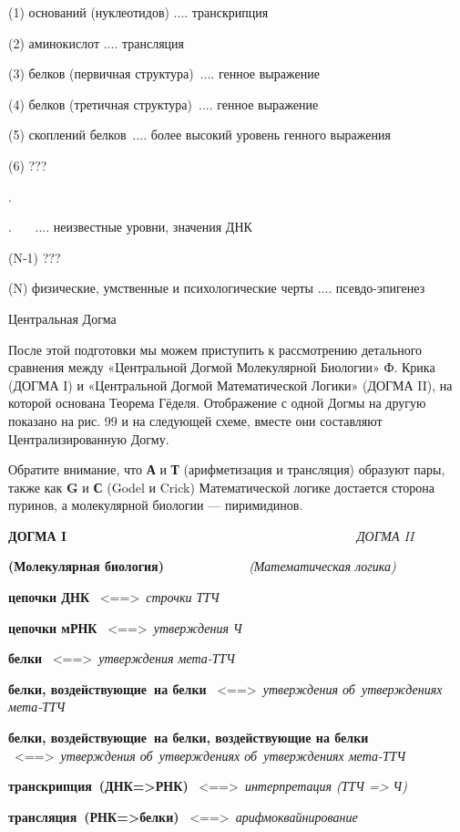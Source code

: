 \documentclass[../main.tex]{subfiles}
\begin{document}
(1) оснований (нуклеотидов) .... транскрипция

(2) аминокислот .... трансляция

(3) белков (первичная структура)~.... генное выражение

(4) белков (третичная структура)~.... генное выражение

(5) скоплений белков~.... более высокий уровень генного выражения

(6) ???

.

.~~~ .... неизвестные уровни, значения ДНК

(N-1) ???

(N) физические, умственные и психологические черты .... псевдо-эпигенез

Центральная Догма

После этой подготовки мы можем приступить к рассмотрению детального сравнения между «Центральной Догмой Молекулярной Биологии» Ф. Крика (ДОГМА I) и «Центральной Догмой Математической Логики» (ДОГМА II), на которой основана Теорема Гёделя. Отображение с одной Догмы на другую показано на рис. 99 и на следующей схеме, вместе они составляют Централизированную Догму.

Обратите внимание, что \textbf{А} и \textbf{Т} (арифметизация и трансляция) образуют пары, также как \textbf{G} и \textbf{С} (Godel и Crick) Математической логике достается сторона пуринов, а молекулярной биологии --- пиримидинов.

\textbf{ДОГМА I~~~~~~~~~~~~~~~~~~~~~~~~~~~~~~~~~~~~~~~} \emph{ДОГМА II}

\textbf{(Молекулярная биология)~~~~~~~~~~~} \emph{(Математическая логика)}

\textbf{цепочки ДНК} ~\textless==\textgreater~\emph{строчки ТТЧ}

\textbf{цепочки мРНК} ~\textless==\textgreater~\emph{утверждения Ч}

\textbf{белки} ~\textless==\textgreater~\emph{утверждения мета-ТТЧ}

\textbf{белки, воздействующие~на белки} ~\textless==\textgreater~\emph{утверждения об~утверждениях мета-ТТЧ}

\textbf{белки, воздействующие~на белки, воздействующие на белки} ~\textless==\textgreater~\emph{утверждения об~утверждениях об~утверждениях мета-ТТЧ}

\textbf{транскрипция~(ДНК=\textgreater РНК)} ~\textless==\textgreater~\emph{интерпретация (ТТЧ =\textgreater{} Ч)}

\textbf{трансляция~(РНК=\textgreater белки)} ~\textless==\textgreater~\emph{арифмоквайнирование}
\end{document}
